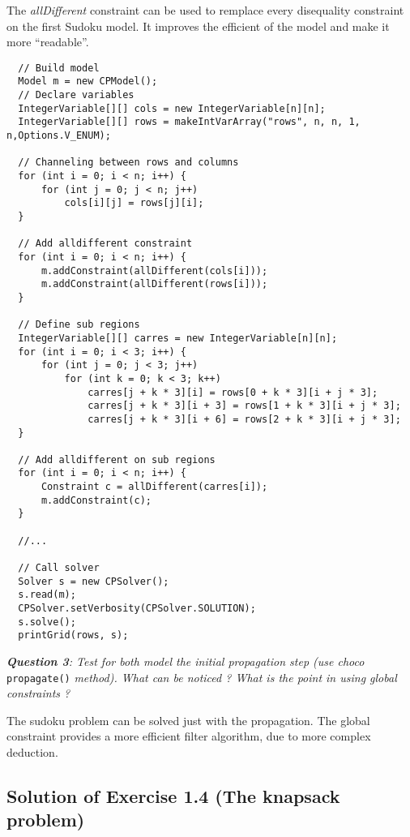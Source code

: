 The \emph{allDifferent} constraint can be used to remplace every disequality constraint on the first Sudoku model. It improves the efficient of the model and make it more ``readable''.

\begin{lstlisting}
  // Build model
  Model m = new CPModel();
  // Declare variables
  IntegerVariable[][] cols = new IntegerVariable[n][n];
  IntegerVariable[][] rows = makeIntVarArray("rows", n, n, 1, n,Options.V_ENUM);
  
  // Channeling between rows and columns
  for (int i = 0; i < n; i++) {
      for (int j = 0; j < n; j++)
          cols[i][j] = rows[j][i];
  }
	
  // Add alldifferent constraint
  for (int i = 0; i < n; i++) {
      m.addConstraint(allDifferent(cols[i]));
      m.addConstraint(allDifferent(rows[i]));
  }

  // Define sub regions
  IntegerVariable[][] carres = new IntegerVariable[n][n];
  for (int i = 0; i < 3; i++) {
      for (int j = 0; j < 3; j++)
          for (int k = 0; k < 3; k++)
              carres[j + k * 3][i] = rows[0 + k * 3][i + j * 3];
              carres[j + k * 3][i + 3] = rows[1 + k * 3][i + j * 3];
              carres[j + k * 3][i + 6] = rows[2 + k * 3][i + j * 3];
  }
	
  // Add alldifferent on sub regions
  for (int i = 0; i < n; i++) {
      Constraint c = allDifferent(carres[i]);
      m.addConstraint(c);
  }
  
  //...
	
  // Call solver
  Solver s = new CPSolver();
  s.read(m);
  CPSolver.setVerbosity(CPSolver.SOLUTION);
  s.solve();
  printGrid(rows, s);
\end{lstlisting} 

\noindent\emph{\textbf{Question 3}: Test for both model the initial propagation step (use choco} \texttt{propagate()} \emph{method). What can be noticed ? What is the point in using global constraints ?}

The sudoku problem can be solved just with the propagation. 
The global constraint provides a more efficient filter algorithm, due to more complex deduction.

\subsection{Solution of Exercise 1.4 (The knapsack problem)}\label{solutions:solutionofexercise1.4}\hypertarget{solutions:solutionofexercise1.4}{}

